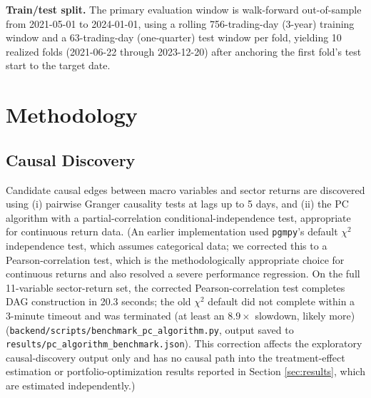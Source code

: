 \documentclass[10pt,twocolumn]{article}
\begin{document}
\textbf{Train/test split.} The primary evaluation window is walk-forward
out-of-sample from 2021-05-01 to 2024-01-01, using a rolling 756-trading-day
(3-year) training window and a 63-trading-day (one-quarter) test window per
fold, yielding 10 realized folds (2021-06-22 through 2023-12-20) after
anchoring the first fold's test start to the target date.

\section{Methodology}
\label{sec:methodology}

\subsection{Causal Discovery}
Candidate causal edges between macro variables and sector returns are
discovered using (i) pairwise Granger causality tests
\citep{granger1969investigating} at lags up to 5 days, and (ii) the PC
algorithm \citep{spirtes2000causation} with a partial-correlation
conditional-independence test, appropriate for continuous return data.
(An earlier implementation used \texttt{pgmpy}'s default $\chi^2$
independence test, which assumes categorical data; we corrected this to
a Pearson-correlation test, which is the methodologically appropriate
choice for continuous returns and also resolved a severe performance
regression. On the full 11-variable sector-return set, the corrected
Pearson-correlation test completes DAG construction in 20.3 seconds; the
old $\chi^2$ default did not complete within a 3-minute timeout and was
terminated (at least an $8.9\times$ slowdown, likely more)
(\texttt{backend/scripts/benchmark\_pc\_algorithm.py}, output saved to
\texttt{results/pc\_algorithm\_benchmark.json}). This correction affects
the exploratory causal-discovery output only and has no causal path into
the treatment-effect estimation or portfolio-optimization results
reported in Section \ref{sec:results}, which are estimated
independently.)
\end{document}
